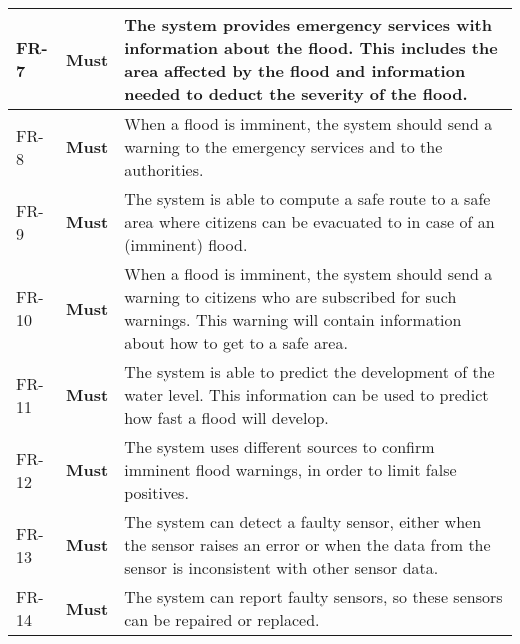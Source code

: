 \begin{longtable}{L{0.1\textwidth} L{0.1\textwidth} L{0.8\textwidth}}
    \midrule {} \label{fr:7} FR-7 & 
      \textbf{Must} &
     The system provides emergency services with information about the flood. This includes the area affected by the flood and information needed to deduct the severity of the flood. \\
    
	\midrule {} \label{fr:8} FR-8 & 
      \textbf{Must} &
      When a flood is imminent, the system should send a warning to the emergency services and to the authorities.\\
    
    \midrule {} \label{fr:9} FR-9 & 
      \textbf{Must} &
      The system is able to compute a safe route to a safe area where citizens can be evacuated to in case of an (imminent) flood. \\ 

    \midrule {} \label{fr:10} FR-10 & 
      \textbf{Must} &
      When a flood is imminent, the system should send a warning to citizens who are subscribed for such warnings. This warning will contain information about how to get to a safe area. \\
	
    \midrule {} \label{fr:11} FR-11 & 
      \textbf{Must} &
      The system is able to predict the development of the water level. This information can be used to predict how fast a flood will develop. \\
	
    \midrule {} \label{fr:12} FR-12 & 
      \textbf{Must} &
     The system uses different sources to confirm imminent flood warnings, in order to limit false positives. \\%
	
    \midrule {} \label{fr:13} FR-13 & 
      \textbf{Must} &
     The system can detect a faulty sensor, either when the sensor raises an error or when the data from the sensor is inconsistent with other sensor data. \\
	
    \midrule {} \label{fr:14} FR-14 & 
      \textbf{Must} &
     The system can report faulty sensors, so these sensors can be repaired or replaced. \\ %
    

\end{longtable}
